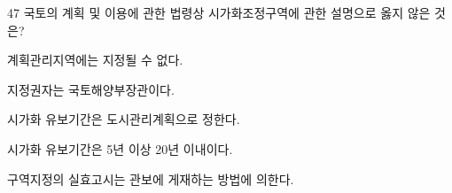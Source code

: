 \begin{question}{47}
국토의 계획 및 이용에 관한 법령상 시가화조정구역에 관한 설명으로 옳지 않은 것은?
\begin{choices}
  \item 계획관리지역에는 지정될 수 없다.
  \item 지정권자는 국토해양부장관이다.
  \item 시가화 유보기간은 도시관리계획으로 정한다.
  \item 시가화 유보기간은 5년 이상 20년 이내이다.
  \item 구역지정의 실효고시는 관보에 게재하는 방법에 의한다.
\end{choices}
\end{question}
